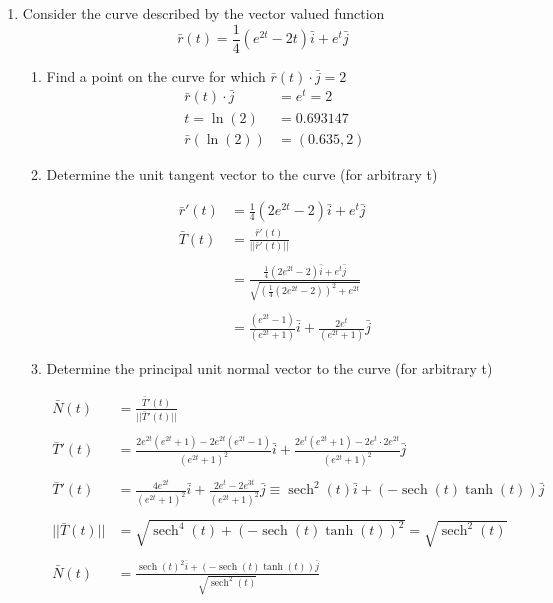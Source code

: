 \documentclass[a4paper,11pt]{article}
\begin{document}
\begin{enumerate}
\begin{enumerate}
    \end{enumerate}

    \item Consider the curve described by the vector valued function
    $$ \bar{r}(t) = \frac{1}{4}(e^{2t}-2t)\bar{i} + e^t\bar{j} $$

    \begin{enumerate}
        \item   Find a point on the curve for which $\bar{r}(t) \cdot \bar{j}=2$
        \begin{align*}
            \bar{r}(t) \cdot \bar{j} &= e^t = 2\\
            t = \ln(2)&=0.693147\\
            \bar{r}(\ln(2)) &= (0.635, 2)
        \end{align*}
        \newpage

        \item Determine the unit tangent vector to the curve (for arbitrary t)
        
        \begin{align*}
            \bar{r}'(t) &= \frac{1}{4}(2e^{2t}-2)\bar{i} + e^t\bar{j}\\
            \bar{T}(t) &= \frac{\bar{r}'(t)}{|| \bar{r}'(t) ||}\\\\
            &= \frac{\frac{1}{4}(2e^{2t}-2)\bar{i} + e^t\bar{j}}{\sqrt{ (\frac{1}{4}(2e^{2t}-2))^2 + e^{2t}}}\\\\
            &= \frac{(e^{2t}-1)} {(e^{2t}+1)} \bar{i} + \frac{2e^t}{ (e^{2t}+1)} \bar{j}
        \end{align*}

        \item  Determine the principal unit normal vector to the curve (for arbitrary t)
        
        \begin{align*}
            \bar{N}(t) &= \frac{\bar{T}'(t)}{|| \bar{T}'(t) ||}\\\\
            \bar{T}'(t) &= \frac{ 2e^{2t}(e^{2t}+1) - 2e^{2t}(e^{2t}-1)}{ (e^{2t}+1)^2 } \bar{i} + 
            \frac{ 2e^t (e^{2t}+1) - 2e^t \cdot 2e^{2t}}{ (e^{2t}+1)^2 }\bar{j}\\\\
            \bar{T}'(t) &= \frac{4e^{2t}}{(e^{2t}+1)^{2}}\bar{i} + \frac{2e^{t}-2e^{3t}}{(e^{2t}+1)^{2}}\bar{j} \equiv \operatorname{sech}^2(t)\bar{i} + (-\operatorname{sech}(t) \operatorname{tanh}(t))\bar{j}\\\\
            || \bar{T}(t) || &= \sqrt{ \operatorname{sech}^4(t) + (-\operatorname{sech}(t) \operatorname{tanh}(t)) ^2 } = \sqrt{\operatorname{sech}^2(t)} \\\\
            \bar{N}(t) &= \frac{\operatorname{sech}\left(t\right)^{2}\overline{i}+\left(-\operatorname{sech}\left(t\right)\tanh\left(t\right)\right)\overline{j}}{\sqrt{\operatorname{sech}^2(t)}}
        \end{align*}


\end{enumerate}
\end{enumerate}
\end{document}
